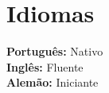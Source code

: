 \documentclass[letterpaper,11pt]{article}
\makeatletter
\newcommand{\resumeOrganizationHeading}[4]{
  \vspace{-2pt}\item
    \begin{tabular*}{0.97\textwidth}[t]{l@{\extracolsep{\fill}}r}
      \textbf{#1} & \textit{\small #2} \\
      \textit{\small#3}
    \end{tabular*}\vspace{-7pt}
}
\newcommand{\resumeSubHeadingListStart}{\begin{itemize}[leftmargin=0.15in, label={}]}
\newcommand{\resumeSubHeadingListEnd}{\end{itemize}}
\makeatother
\begin{document}
\section{Idiomas}
  \vspace{2pt}
  \resumeSubHeadingListStart
    \small{\item{
        \textbf{Português: }{Nativo} \\ \vspace{3pt}
        \textbf{Inglês: }{Fluente} \\ \vspace{3pt}
        \textbf{Alemão: }{Iniciante} \\ \vspace{3pt}

    }}
  \resumeSubHeadingListEnd




    
    




    
    











\end{document}
